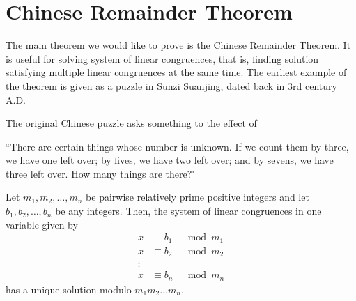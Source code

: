 \section{Chinese Remainder Theorem}

The main theorem we would like to prove is the Chinese Remainder Theorem. It is useful for solving system of linear congruences, that is, finding solution satisfying multiple linear congruences at the same time. The earliest example of the theorem is given as a puzzle in Sunzi Suanjing, dated back in 3rd century A.D.

The original Chinese puzzle asks something to the effect of

\begin{center}
    ``There are certain things whose number is unknown. If we count them by three, we have one left over; by fives, we have two left over; and by sevens, we have three left over. How many things are there?"
\end{center}

\begin{theorem}
    Let $m_1,m_2,\ldots,m_n$ be pairwise relatively prime positive integers and let $b_1,b_2,\ldots,b_n$ be any integers. Then, the system of linear congruences in one variable given by
    $$
    \begin{aligned}
        x &\equiv b_1 &\mod m_1 \\
        x &\equiv b_2 &\mod m_2 \\
        \vdots && \\
        x & \equiv b_n &\mod m_n
    \end{aligned}
    $$
    has a unique solution modulo $m_1m_2\ldots m_n$.
\end{theorem}

